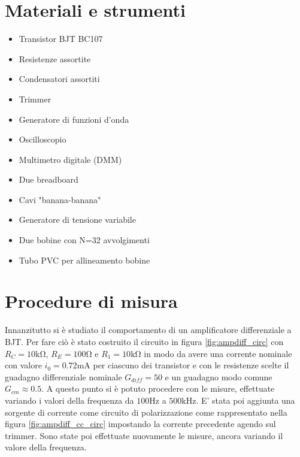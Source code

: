 \documentclass{article}
\begin{document}
\section{Materiali e strumenti}
\begin{itemize}
    \item Transistor BJT BC107
    \item Resistenze assortite
    \item Condensatori assortiti
    \item Trimmer
    \item Generatore di funzioni d'onda
    \item Oscilloscopio
    \item Multimetro digitale (DMM)
    \item Due breadboard
    \item Cavi "banana-banana"
    \item Generatore di tensione variabile
    \item Due bobine con N=32 avvolgimenti
    \item Tubo PVC per allineamento bobine
\end{itemize}

\section{Procedure di misura}
Innanzitutto si è studiato il comportamento di un amplificatore differenziale a BJT. Per fare ciò è stato costruito il circuito in figura \ref{fig:ampdiff_circ} con $R_C=10\si{\kilo\ohm}$, $R_E=100\si{\ohm}$ e $R_1=10\si{\kilo\ohm}$ in modo da avere una corrente nominale con valore $i_0=0.72\si{\milli\ampere}$ per ciascuno dei transistor e con le resistenze scelte il guadagno differenziale nominale $G_{diff}=50$ e un guadagno modo comune $G_{cm} \approx 0.5$. A questo punto si è potuto procedere con le misure, effettuate variando i valori della frequenza da $100\si{\hertz}$ a $500\si{\kilo\hertz}$. E' stata poi aggiunta una sorgente di corrente come circuito di polarizzazione come rappresentato nella figura \ref{fig:ampdiff_cc_circ} impostando la corrente precedente agendo sul trimmer. Sono state poi effettuate nuovamente le misure, ancora variando il valore della frequenza. \\
\end{document}
